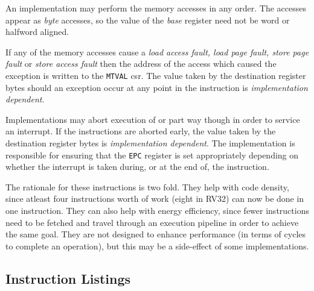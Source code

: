 
An implementation may perform the memory accesses in any order. The accesses
appear as {\em byte} accesses, so the value of the {\em base} register
need not be word or halfword aligned.

If any of the memory accesses cause
a {\em load access fault, load page fault, store page fault} or
{\em store access fault} then the address of the access which caused the
exception is written to the {\tt MTVAL} csr. The value taken by the
destination register bytes should an exception occur at any point in the
instruction is {\em implementation dependent}.

Implementations may abort execution of  or  part way
though in order to service an interrupt. If the instructions are aborted
early, the value taken by the destination register bytes is {\em
implementation dependent}. The implementation is responsible for ensuring
that the {\tt EPC} register is set appropriately depending on whether the
interrupt is taken during, or at the end of, the instruction.

The rationale for these instructions is two fold. They help with code density,
since atleast four instructions worth of work (eight in RV32) can now be done
in one instruction. They can also help with energy efficiency, since fewer
instructions need to be fetched and travel through an execution pipeline in
order to achieve the same goal. They are not designed to enhance performance
(in terms of cycles to complete an operation), but this may be a side-effect
of some implementations.

\newpage
\subsection{Instruction Listings}

